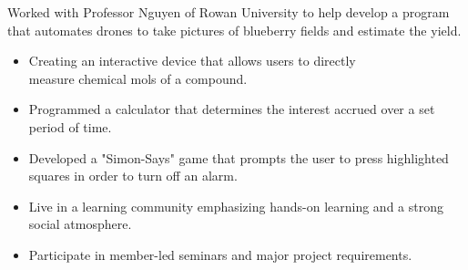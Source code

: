 \documentclass[10pt,a4paper,ragged2e,withhyper]{altacv}
\begin{document}
\begin{paracol}{2}
Worked with Professor Nguyen of Rowan University to help develop a program that automates drones to take pictures of blueberry fields and estimate the yield.
\\ 
\switchcolumn
{}

\begin{itemize}
    \item Creating an interactive device that allows users to directly \\ measure chemical mols of a compound.  
   \\
\end{itemize}\par


\divider 

\begin{itemize}
    \item Programmed a calculator that determines the interest accrued over a set period of time. 
    \\
  
\end{itemize}

\divider

\begin{itemize}
    \item Developed a "Simon-Says" game that prompts the user to press highlighted squares in order to turn off an alarm.
    \\
\end{itemize}

\smallskip


\begin{itemize}
    \item Live in a learning community emphasizing hands-on learning and a strong social atmosphere.
    \item Participate in member-led seminars and major project requirements.
\end{itemize}


\end{paracol}
\end{document}
